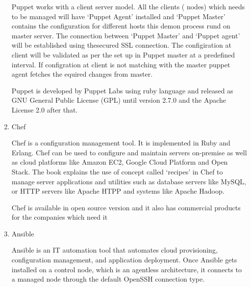 \begin{enumerate}
Puppet works with a client server model. All the clients (
nodes)  which needs to be managed will have `Puppet Agent'
installed and `Puppet Master' contains the configuration for
different hosts this demon process rund on master server. The
connection between `Puppet Master' and `Puppet agent' will be
established using thesecured SSL connection. The configiration
at client will be validated as per the set up in Puppet master
at a predefined interval. If configration at client is not
matching with the master puppet agent fetches the equired
changes from master. \label{\detokenize{i524/technologies:id575}}{\hyperref[\detokenize{i524/technologies:www-puppet-slashroot}]{\sphinxcrossref{{[}494{]}}}}

Puppet is developed by Puppet Labs
using ruby language and released as GNU General Public License
(GPL) until version 2.7.0 and the Apache License 2.0 after
that. \label{\detokenize{i524/technologies:id576}}{\hyperref[\detokenize{i524/technologies:www-puppet-wiki-puppet}]{\sphinxcrossref{{[}492{]}}}}

\item {} 
Chef

Chef is a configuration management tool. It is implemented in
Ruby and Erlang. Chef can be used to configure and maintain
servers on-premise as well as cloud platforms like Amazon EC2,
Google Cloud Platform and Open Stack. The book
\label{\detokenize{i524/technologies:id577}}{\hyperref[\detokenize{i524/technologies:chef-book}]{\sphinxcrossref{{[}495{]}}}} explains the use of concept called `recipes' in
Chef to manage server applications and utilities such as database
servers like MySQL, or HTTP servers like Apache HTPP and systems
like Apache Hadoop.

Chef is available in open source version and it also has
commercial products for the companies which need it
\label{\detokenize{i524/technologies:id578}}{\hyperref[\detokenize{i524/technologies:www-chef-commercial}]{\sphinxcrossref{{[}496{]}}}}

\item {} 
Ansible

Ansible is an IT automation tool that automates cloud
provisioning, configuration management, and application
deployment. \label{\detokenize{i524/technologies:id579}}{\hyperref[\detokenize{i524/technologies:www-ansible}]{\sphinxcrossref{{[}497{]}}}} Once Ansible gets installed on a
control node, which is an agentless architecture, it connects to
a managed node through the default OpenSSH connection
type. \label{\detokenize{i524/technologies:id580}}{\hyperref[\detokenize{i524/technologies:www-ansible-wikipedia}]{\sphinxcrossref{{[}498{]}}}}


\end{enumerate}
